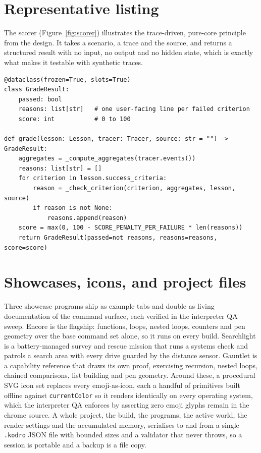 \documentclass[11pt,a4paper]{report}
\begin{document}
\section{Representative listing}
The scorer (Figure~\ref{fig:scorer}) illustrates the trace-driven, pure-core principle from the design. It takes a scenario, a trace and the source, and returns a structured result with no input, no output and no hidden state, which is exactly what makes it testable with synthetic traces.

\begin{lstlisting}
@dataclass(frozen=True, slots=True)
class GradeResult:
    passed: bool
    reasons: list[str]   # one user-facing line per failed criterion
    score: int           # 0 to 100

def grade(lesson: Lesson, tracer: Tracer, source: str = "") -> GradeResult:
    aggregates = _compute_aggregates(tracer.events())
    reasons: list[str] = []
    for criterion in lesson.success_criteria:
        reason = _check_criterion(criterion, aggregates, lesson, source)
        if reason is not None:
            reasons.append(reason)
    score = max(0, 100 - SCORE_PENALTY_PER_FAILURE * len(reasons))
    return GradeResult(passed=not reasons, reasons=reasons, score=score)
\end{lstlisting}
\label{fig:scorer}

\section{Showcases, icons, and project files}
Three showcase programs ship as example tabs and double as living documentation of the command surface, each verified in the interpreter QA sweep. Encore is the flagship: functions, loops, nested loops, counters and pen geometry over the base command set alone, so it runs on every build. Searchlight is a battery-managed survey and rescue mission that runs a systems check and patrols a search area with every drive guarded by the distance sensor. Gauntlet is a capability reference that draws its own proof, exercising recursion, nested loops, chained comparisons, list building and pen geometry. Around these, a procedural SVG icon set replaces every emoji-as-icon, each a handful of primitives built offline against \texttt{currentColor} so it renders identically on every operating system, which the interpreter QA enforces by asserting zero emoji glyphs remain in the chrome source. A whole project, the build, the programs, the active world, the render settings and the accumulated memory, serialises to and from a single \texttt{.kodro} JSON file with bounded sizes and a validator that never throws, so a session is portable and a backup is a file copy.
\end{document}
